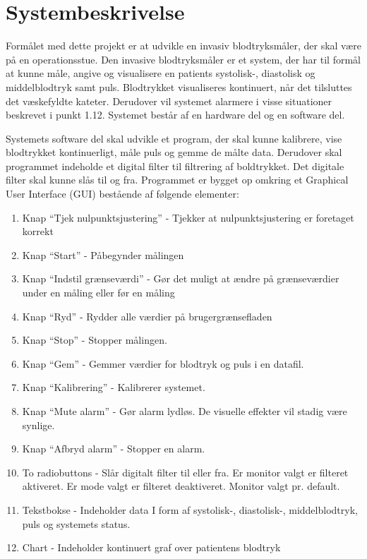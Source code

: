 \section{Systembeskrivelse}
Formålet med dette projekt er at udvikle en invasiv blodtryksmåler, der skal være på en operationsstue. Den invasive blodtryksmåler er et system, der har til formål at kunne måle, angive og visualisere en patients systolisk-, diastolisk og middelblodtryk samt puls. Blodtrykket visualiseres kontinuert, når det tilsluttes det væskefyldte kateter. Derudover vil systemet alarmere i visse situationer beskrevet i punkt 1.12.
Systemet består af en hardware del og en software del. 


Systemets software del skal udvikle et program, der skal kunne kalibrere, vise blodtrykket kontinuerligt, måle puls og gemme de målte data. Derudover skal programmet indeholde et digital filter til filtrering af boldtrykket. Det digitale filter skal kunne slås til og fra. Programmet er bygget op omkring et Graphical User Interface (GUI) bestående af følgende elementer:
\vspace{0.7 cm}

\begin{enumerate}[2.1.]
	\item Knap “Tjek nulpunktsjustering” - Tjekker at nulpunktsjustering er foretaget korrekt
	\item Knap “Start” - Påbegynder målingen
	\item Knap “Indstil grænseværdi” - Gør det muligt at ændre på grænseværdier under en måling eller før en måling 
	\item Knap “Ryd” - Rydder alle værdier på brugergrænsefladen
	\item Knap “Stop” - Stopper målingen.
	\item Knap “Gem” - Gemmer værdier for blodtryk og puls i en datafil.
	\item Knap “Kalibrering” - Kalibrerer systemet.
	\item Knap “Mute alarm” - Gør alarm lydløs. De visuelle effekter vil stadig være synlige.
	\item Knap “Afbryd alarm” - Stopper en alarm.
	\item To radiobuttons - Slår digitalt filter til eller fra. Er monitor valgt er filteret aktiveret. Er mode valgt er filteret deaktiveret. Monitor valgt pr. default. 
	\item Tekstbokse - Indeholder data I form af systolisk-, diastolisk-, middelblodtryk, puls og systemets status. 
	\item Chart - Indeholder kontinuert graf over patientens blodtryk
\end{enumerate}

